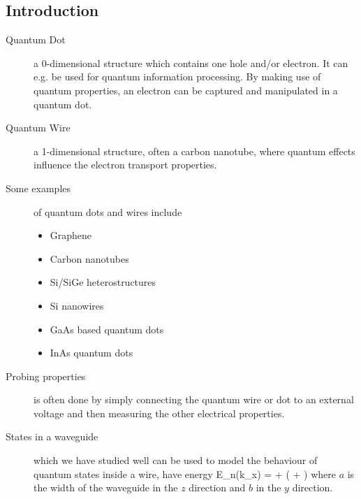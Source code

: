 \subsection{Introduction}
\begin{description}
\item[Quantum Dot] a 0-dimensional structure which contains one hole and/or electron. It can e.g. be used for quantum information processing. By making use of quantum properties, an electron can be captured and manipulated in a quantum dot. 

\item[Quantum Wire] a 1-dimensional structure, often a carbon nanotube, where quantum effects influence the electron transport properties. 

\item[Some examples] of quantum dots and wires include
\begin{itemize}
\item Graphene 
\item Carbon nanotubes
\item Si/SiGe heterostructures 
\item Si nanowires
\item GaAs based quantum dots
\item InAs quantum dots
\end{itemize}

\item[Probing properties] is often done by simply connecting the quantum wire or dot to an external voltage and then measuring the other electrical properties. 

\item[States in a waveguide] which we have studied well can be used to model the behaviour of quantum states inside a wire, have energy
\beq
E_n(k_x) =  +  \left(  +  \right)
\eeq
where $a$ is the width of the waveguide in the $z$ direction and $b$ in the $y$ direction. 


\end{description}
